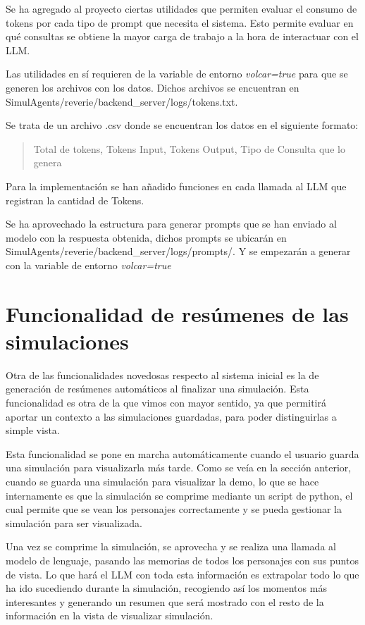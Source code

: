 Se ha agregado al proyecto ciertas utilidades que permiten evaluar el consumo de tokens por cada tipo de prompt que necesita el sistema. Esto permite evaluar en qué consultas se obtiene la mayor carga de trabajo a la hora de interactuar con el LLM.

Las utilidades en sí requieren de la variable de entorno \textit{volcar=true} para que se generen los archivos con los datos. Dichos archivos se encuentran en SimulAgents/reverie/backend\_server/logs/tokens.txt.

Se trata de un archivo .csv donde se encuentran los datos en el siguiente formato:
\begin{quote}
    Total de tokens, Tokens Input, Tokens Output, Tipo de Consulta que lo genera
\end{quote}

Para la implementación se han añadido funciones en cada llamada al LLM que registran la cantidad de Tokens.

Se ha aprovechado la estructura para generar prompts que se han enviado al modelo con la respuesta obtenida, dichos prompts se ubicarán en SimulAgents/reverie/backend\_server/logs/prompts/. Y se empezarán a generar con la variable de entorno \textit{volcar=true}

\section{Funcionalidad de resúmenes de las simulaciones}

Otra de las funcionalidades novedosas respecto al sistema inicial es la de generación de resúmenes automáticos al finalizar una simulación. Esta funcionalidad es otra de la que vimos con mayor sentido, ya que permitirá aportar un contexto a las simulaciones guardadas, para poder distinguirlas a simple vista.

Esta funcionalidad se pone en marcha automáticamente cuando el usuario guarda una simulación para visualizarla más tarde. Como se veía en la sección anterior, cuando se guarda una simulación para visualizar la demo, lo que se hace internamente es que la simulación se comprime mediante un script de python, el cual permite que se vean los personajes correctamente y se pueda gestionar la simulación para ser visualizada.

Una vez se comprime la simulación, se aprovecha y se realiza una llamada al modelo de lenguaje, pasando las memorias de todos los personajes con sus puntos de vista. Lo que hará el LLM con toda esta información es extrapolar todo lo que ha ido sucediendo durante la simulación, recogiendo así los momentos más interesantes y generando un resumen que será mostrado con el resto de la información en la vista de visualizar simulación.

